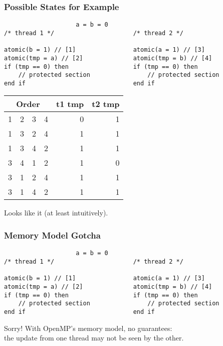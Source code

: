 \begin{frame}[fragile]
  \frametitle{Possible States for Example}

  \begin{lstlisting}
                    a = b = 0
/* thread 1 */                      /* thread 2 */

atomic(b = 1) // [1]                atomic(a = 1) // [3]
atomic(tmp = a) // [2]              atomic(tmp = b) // [4]
if (tmp == 0) then                  if (tmp == 0) then
    // protected section                // protected section
end if                              end if
  \end{lstlisting}

  \begin{center}
  \begin{tabular}{r r r r | r r}
    \multicolumn{4}{c|}{Order} & t1 tmp & t2 tmp\\
    \hline
    1 & 2 & 3 & 4 & 0 & 1\\
    1 & 3 & 2 & 4 & 1 & 1\\
    1 & 3 & 4 & 2 & 1 & 1\\
    3 & 4 & 1 & 2 & 1 & 0\\
    3 & 1 & 2 & 4 & 1 & 1\\
    3 & 1 & 4 & 2 & 1 & 1\\
  \end{tabular}
  \end{center}

  
    Looks like it (at least intuitively).
  
\end{frame}

\begin{frame}[fragile]
  \frametitle{Memory Model Gotcha}

  \begin{lstlisting}
                    a = b = 0
/* thread 1 */                      /* thread 2 */

atomic(b = 1) // [1]                atomic(a = 1) // [3]
atomic(tmp = a) // [2]              atomic(tmp = b) // [4]
if (tmp == 0) then                  if (tmp == 0) then
    // protected section                // protected section
end if                              end if
  \end{lstlisting}

  
    Sorry! With OpenMP's memory model, no guarantees:\\
    the update from one thread may not be seen by the other.
  
\end{frame}


